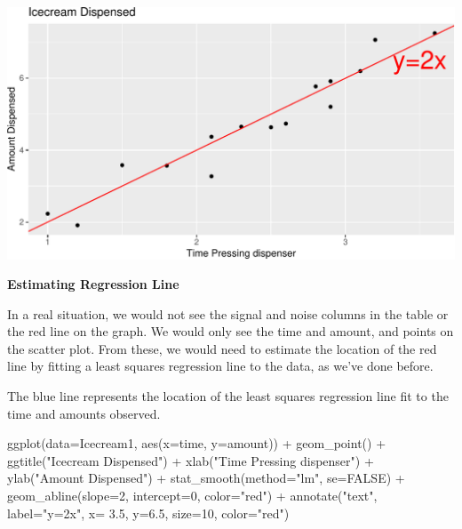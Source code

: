 \documentclass[
  letterpaper,
  DIV=11,
  numbers=noendperiod]{scrreprt}
\newenvironment{Shaded}{\begin{snugshade}}{\end{snugshade}}
\newcommand{\AttributeTok}[1]{\textcolor[rgb]{0.40,0.45,0.13}{#1}}
\newcommand{\ConstantTok}[1]{\textcolor[rgb]{0.56,0.35,0.01}{#1}}
\newcommand{\DecValTok}[1]{\textcolor[rgb]{0.68,0.00,0.00}{#1}}
\newcommand{\FloatTok}[1]{\textcolor[rgb]{0.68,0.00,0.00}{#1}}
\newcommand{\FunctionTok}[1]{\textcolor[rgb]{0.28,0.35,0.67}{#1}}
\newcommand{\NormalTok}[1]{\textcolor[rgb]{0.00,0.23,0.31}{#1}}
\newcommand{\SpecialCharTok}[1]{\textcolor[rgb]{0.37,0.37,0.37}{#1}}
\newcommand{\StringTok}[1]{\textcolor[rgb]{0.13,0.47,0.30}{#1}}
\begin{document}
\includegraphics{Ch4_files/figure-pdf/unnamed-chunk-11-1.pdf}

\textbf{Estimating Regression Line}

In a real situation, we would not see the signal and noise columns in
the table or the red line on the graph. We would only see the time and
amount, and points on the scatter plot. From these, we would need to
estimate the location of the red line by fitting a least squares
regression line to the data, as we've done before.

The blue line represents the location of the least squares regression
line fit to the time and amounts observed.

\begin{Shaded}
\begin{Highlighting}[]
\FunctionTok{ggplot}\NormalTok{(}\AttributeTok{data=}\NormalTok{Icecream1, }\FunctionTok{aes}\NormalTok{(}\AttributeTok{x=}\NormalTok{time, }\AttributeTok{y=}\NormalTok{amount)) }\SpecialCharTok{+} \FunctionTok{geom\_point}\NormalTok{() }\SpecialCharTok{+} \FunctionTok{ggtitle}\NormalTok{(}\StringTok{"Icecream Dispensed"}\NormalTok{) }\SpecialCharTok{+} \FunctionTok{xlab}\NormalTok{(}\StringTok{"Time Pressing dispenser"}\NormalTok{) }\SpecialCharTok{+} \FunctionTok{ylab}\NormalTok{(}\StringTok{"Amount Dispensed"}\NormalTok{) }\SpecialCharTok{+} \FunctionTok{stat\_smooth}\NormalTok{(}\AttributeTok{method=}\StringTok{"lm"}\NormalTok{, }\AttributeTok{se=}\ConstantTok{FALSE}\NormalTok{) }\SpecialCharTok{+} \FunctionTok{geom\_abline}\NormalTok{(}\AttributeTok{slope=}\DecValTok{2}\NormalTok{, }\AttributeTok{intercept=}\DecValTok{0}\NormalTok{, }\AttributeTok{color=}\StringTok{"red"}\NormalTok{) }\SpecialCharTok{+} 
  \FunctionTok{annotate}\NormalTok{(}\StringTok{"text"}\NormalTok{, }\AttributeTok{label=}\StringTok{"y=2x"}\NormalTok{, }\AttributeTok{x=} \FloatTok{3.5}\NormalTok{, }\AttributeTok{y=}\FloatTok{6.5}\NormalTok{, }\AttributeTok{size=}\DecValTok{10}\NormalTok{, }\AttributeTok{color=}\StringTok{"red"}\NormalTok{)}
\end{Highlighting}
\end{Shaded}
\end{document}
